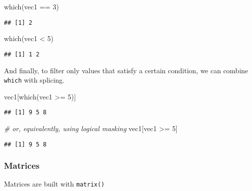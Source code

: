 \documentclass[
  oneside]{book}
\newenvironment{Shaded}{\begin{snugshade}}{\end{snugshade}}
\newcommand{\CommentTok}[1]{\textcolor[rgb]{0.56,0.35,0.01}{\textit{#1}}}
\newcommand{\DecValTok}[1]{\textcolor[rgb]{0.00,0.00,0.81}{#1}}
\newcommand{\FunctionTok}[1]{\textcolor[rgb]{0.00,0.00,0.00}{#1}}
\newcommand{\NormalTok}[1]{#1}
\newcommand{\SpecialCharTok}[1]{\textcolor[rgb]{0.00,0.00,0.00}{#1}}
\begin{document}
\begin{Shaded}
\begin{Highlighting}[]
\FunctionTok{which}\NormalTok{(vec1 }\SpecialCharTok{==} \DecValTok{3}\NormalTok{)}
\end{Highlighting}
\end{Shaded}

\begin{verbatim}
## [1] 2
\end{verbatim}

\begin{Shaded}
\begin{Highlighting}[]
\FunctionTok{which}\NormalTok{(vec1 }\SpecialCharTok{\textless{}} \DecValTok{5}\NormalTok{)}
\end{Highlighting}
\end{Shaded}

\begin{verbatim}
## [1] 1 2
\end{verbatim}

And finally, to filter only values that satisfy a
certain condition, we can combine \texttt{which} with
splicing.

\begin{Shaded}
\begin{Highlighting}[]
\NormalTok{vec1[}\FunctionTok{which}\NormalTok{(vec1 }\SpecialCharTok{\textgreater{}=} \DecValTok{5}\NormalTok{)]}
\end{Highlighting}
\end{Shaded}

\begin{verbatim}
## [1] 9 5 8
\end{verbatim}

\begin{Shaded}
\begin{Highlighting}[]
\CommentTok{\# or, equivalently, using logical masking}
\NormalTok{vec1[vec1 }\SpecialCharTok{\textgreater{}=} \DecValTok{5}\NormalTok{]}
\end{Highlighting}
\end{Shaded}

\begin{verbatim}
## [1] 9 5 8
\end{verbatim}

\hypertarget{matrices}{%
\subsubsection{Matrices}\label{matrices}}

Matrices are built with \texttt{matrix()}
\end{document}
